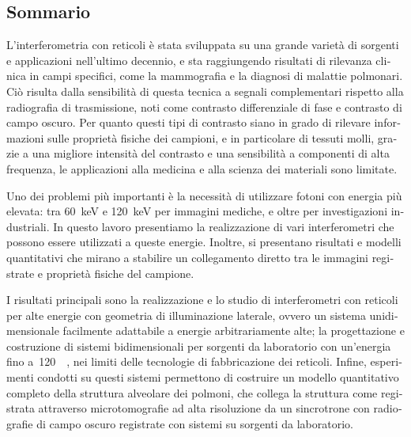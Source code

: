 \begin{otherlanguage}{italian}
\chapter*{Sommario}
L'interferometria con reticoli \`e stata sviluppata su una grande variet\`a
di sorgenti e applicazioni nell'ultimo decennio, e sta raggiungendo
risultati di rilevanza clinica in campi specifici, come la mammografia e la
diagnosi di malattie polmonari. Ci\`o risulta dalla sensibilit\`a di questa
tecnica a segnali complementari rispetto alla radiografia di trasmissione,
noti come contrasto differenziale di fase e contrasto di campo oscuro. Per
quanto questi tipi di contrasto siano in
grado di rilevare informazioni sulle propriet\`a fisiche dei campioni, e in
particolare di tessuti molli, grazie a una migliore intensit\`a del
contrasto e una sensibilit\`a a componenti di alta frequenza, le
applicazioni alla medicina e alla scienza dei materiali sono limitate.

Uno dei problemi pi\`u importanti \`e la necessit\`a di utilizzare 
fotoni con energia pi\`u elevata: tra \SI{60}{\kilo\eV} e
\SI{120}{\kilo\eV} per immagini mediche, e oltre per investigazioni
industriali. In questo lavoro presentiamo la realizzazione di vari
interferometri che possono essere utilizzati a queste energie. Inoltre,
si presentano risultati e modelli quantitativi che mirano a stabilire un
collegamento diretto tra le immagini registrate e propriet\`a fisiche del
campione.

I risultati principali sono la realizzazione e lo studio di interferometri
con reticoli per alte energie con geometria di illuminazione laterale,
ovvero un sistema unidimensionale facilmente adattabile a energie
arbitrariamente alte; la progettazione e costruzione di sistemi
bidimensionali per sorgenti da laboratorio con un'energia fino a~\SI{120}{\kilo\voltpeak},
nei limiti delle tecnologie di fabbricazione dei
reticoli. Infine, esperimenti condotti su questi sistemi permettono di
costruire un modello quantitativo completo della struttura alveolare dei
polmoni, che collega la struttura come registrata attraverso microtomografie
ad alta risoluzione da un sincrotrone con radiografie di campo oscuro
registrate con sistemi su sorgenti da laboratorio.
\end{otherlanguage}

\endgroup

\vfill

